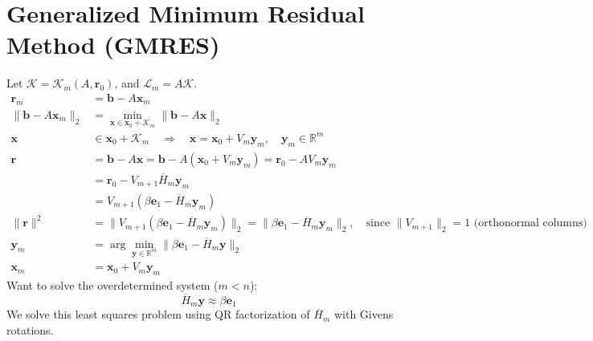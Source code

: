 \section{Generalized Minimum Residual Method (GMRES)}
Let $\mathcal{K} = \mathcal{K}_m(A, \mathbf{r}_0)$, and $\mathcal{L}_m = A\mathcal{K}$.
\begin{align*}
    \mathbf{r}_m                     & = \mathbf{b} - A\mathbf{x}_m                                                                                                                                                                    \\
    \|\mathbf{b} - A\mathbf{x}_m\|_2 & = \min_{\mathbf{x} \in \mathbf{x}_0 + \mathcal{K}_m} \|\mathbf{b} - A\mathbf{x}\|_2                                                                                                             \\
    \mathbf{x}                       & \in \mathbf{x}_0 + \mathcal{K}_m \quad \Rightarrow \quad \mathbf{x} = \mathbf{x}_0 + V_m \mathbf{y}_m, \quad \mathbf{y}_m \in \mathbb{R}^m                                                      \\
    \mathbf{r}                       & = \mathbf{b} - A\mathbf{x} = \mathbf{b} - A(\mathbf{x}_0 + V_m \mathbf{y}_m) = \mathbf{r}_0 - AV_m \mathbf{y}_m                                                                                 \\
                                     & = \mathbf{r}_0 - V_{m+1} \overline{H}_m \mathbf{y}_m                                                                                                                                            \\
                                     & = V_{m+1}(\beta \mathbf{e}_1 - \overline{H}_m \mathbf{y}_m)                                                                                                                                     \\
    \|\mathbf{r}\|^2                 & = \|V_{m+1}(\beta \mathbf{e}_1 - \overline{H}_m \mathbf{y}_m)\|_2 = \|\beta \mathbf{e}_1 - \overline{H}_m \mathbf{y}_m\|_2, \quad \text{since } \|V_{m+1}\|_2 = 1 \text{ (orthonormal columns)} \\
    \mathbf{y}_m                     & = \arg\min_{\mathbf{y} \in \mathbb{R}^m} \|\beta \mathbf{e}_1 - \overline{H}_m \mathbf{y}\|_2                                                                                                   \\
    \mathbf{x}_m                     & = \mathbf{x}_0 + V_m \mathbf{y}_m
\end{align*}
Want to solve the overdetermined system ($m < n$):
\[
    \overline{H}_m \mathbf{y} \approx \beta \mathbf{e}_1
\]
We solve this least squares problem using QR factorization of $\overline{H}_m$ with Givens rotations.

